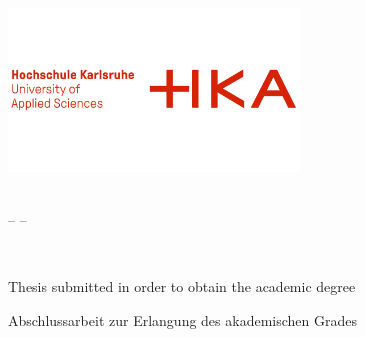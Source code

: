 \thispagestyle{empty}

\begin{titlepage}
	
	\vspace*{-2,5cm}
  	\begin{center}
    		\includegraphics[width=7.7cm]{Figures/png/HKA_Logo.png} \\ 
  	\end{center}

  	\begin{center}
		\vspace{0.1cm}
		\LARGE \textbf{\University}\\
		\vspace{0.4cm}
		\Large -- \Faculty --
	\end{center}
	
	\vfill
	
	\begin{center}
		\huge \textbf{\ThesisTitle}\\
		\vspace{0.4cm}
		\LARGE \ThesisSubtitle
	\end{center}
	
	\vfill
	
	\ifdefined\ThesisLanguageIsEnglish
		\begin{center}
			\Large Thesis submitted in order to obtain the academic degree\\
			\vspace{0.3cm}
			\Large \ThesisDegree
		\end{center}
	\else
		\begin{center}
			\Large Abschlussarbeit zur Erlangung des akademischen Grades\\
			\vspace{0.3cm}
			\Large \ThesisDegree   %
		\end{center}
	\fi
	

\end{titlepage}

